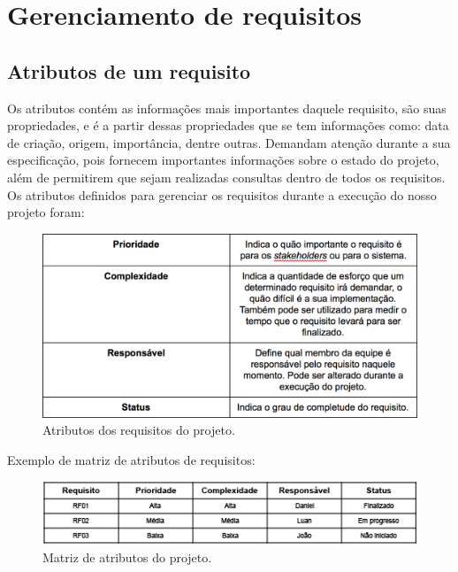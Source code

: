 \chapter[Gerenciamento de requisitos]{Gerenciamento de requisitos}
\section{Atributos de um requisito}
Os atributos contém as informações mais importantes daquele requisito, são suas propriedades, e é a partir dessas propriedades que se tem informações como: data de criação, origem, importância, dentre outras. Demandam atenção durante a sua especificação, pois fornecem importantes informações sobre o estado do projeto, além de permitirem que sejam realizadas consultas dentro de todos os requisitos.
Os atributos definidos para gerenciar os requisitos durante a execução do nosso projeto foram:
  \begin{figure}[!htbp]
    \centering
    \includegraphics[scale=0.65]{editaveis/figuras/tabela_atributos}
    \caption[Atributos dos requisitos do projeto]{Atributos dos requisitos do projeto. \footnotemark}
    \label{tabela_atributos}
  \end{figure}
  
  Exemplo de matriz de atributos de requisitos:
    \begin{figure}[!htbp]
    \centering
    \includegraphics[scale=0.65]{editaveis/figuras/matriz_atributos}
    \caption[Matriz de atributos do projeto.]{Matriz de atributos do projeto. \footnotemark}
    \label{tabela_matriz_atributos}
  \end{figure}
